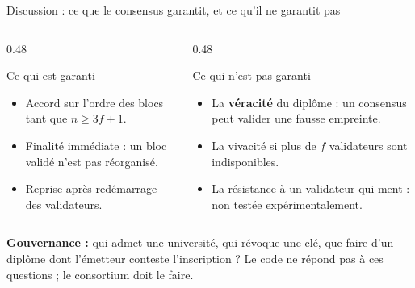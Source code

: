 \documentclass[10pt,aspectratio=169]{beamer}
\begin{document}
\begin{frame}{Discussion : ce que le consensus garantit, et ce qu'il ne garantit pas}
  \begin{columns}[T,onlytextwidth]
    \begin{column}{0.48\textwidth}
      \begin{block}{Ce qui est garanti}
        \small
        \begin{itemize}
          \item Accord sur l'ordre des blocs tant que $n \geq 3f+1$.
          \item Finalité immédiate : un bloc validé n'est pas réorganisé.
          \item Reprise après redémarrage des validateurs.
        \end{itemize}
      \end{block}
    \end{column}
    \begin{column}{0.48\textwidth}
      \begin{block}{Ce qui n'est pas garanti}
        \small
        \begin{itemize}
          \item La \textbf{véracité} du diplôme : un consensus peut valider une fausse empreinte.
          \item La vivacité si plus de $f$ validateurs sont indisponibles.
          \item La résistance à un validateur qui ment : non testée expérimentalement.
        \end{itemize}
      \end{block}
    \end{column}
  \end{columns}
  \vspace{0.2cm}
  \small
  \textbf{Gouvernance :} qui admet une université, qui révoque une clé, que faire
  d'un diplôme dont l'émetteur conteste l'inscription ? Le code ne répond pas à
  ces questions ; le consortium doit le faire.
\end{frame}
\end{document}
